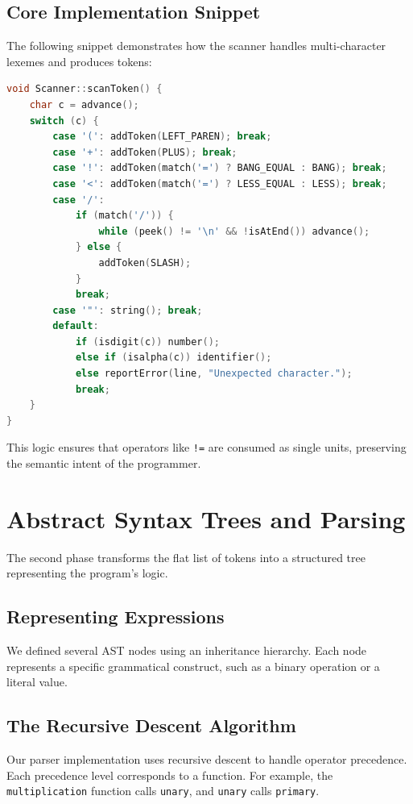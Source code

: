 \documentclass[12pt,a4paper,oneside]{report}
\begin{document}
\section{Core Implementation Snippet}
The following snippet demonstrates how the scanner handles multi-character lexemes and produces tokens:

\begin{lstlisting}[language=C++]
void Scanner::scanToken() {
    char c = advance();
    switch (c) {
        case '(': addToken(LEFT_PAREN); break;
        case '+': addToken(PLUS); break;
        case '!': addToken(match('=') ? BANG_EQUAL : BANG); break;
        case '<': addToken(match('=') ? LESS_EQUAL : LESS); break;
        case '/':
            if (match('/')) {
                while (peek() != '\n' && !isAtEnd()) advance();
            } else {
                addToken(SLASH);
            }
            break;
        case '"': string(); break;
        default:
            if (isdigit(c)) number();
            else if (isalpha(c)) identifier();
            else reportError(line, "Unexpected character.");
            break;
    }
}
\end{lstlisting}

This logic ensures that operators like \texttt{!=} are consumed as single units, preserving the semantic intent of the programmer.

\chapter{Abstract Syntax Trees and Parsing}
The second phase transforms the flat list of tokens into a structured tree representing the program's logic.

\section{Representing Expressions}
We defined several AST nodes using an inheritance hierarchy. Each node represents a specific grammatical construct, such as a binary operation or a literal value.

\section{The Recursive Descent Algorithm}
Our parser implementation uses recursive descent to handle operator precedence. Each precedence level corresponds to a function. For example, the \texttt{multiplication} function calls \texttt{unary}, and \texttt{unary} calls \texttt{primary}.
\end{document}
